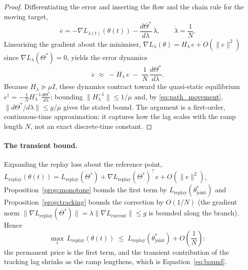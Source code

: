 \begin{proof}
    Differentiating the error and inserting the flow and the chain rule for the moving target,
    \begin{equation*}
        \dot e = -\nabla L_{\lambda(t)}(\theta(t)) - \frac{d\Theta^*}{d\lambda}\,\dot\lambda,
        \qquad \dot\lambda = \frac{1}{N}.
    \end{equation*}
    Linearising the gradient about the minimiser, $\nabla L_\lambda(\theta) = H_\lambda\, e + O(\|e\|^2)$ since $\nabla L_\lambda(\Theta^*) = 0$, yields the error dynamics
    \begin{equation*}
        \dot e \;\approx\; -H_\lambda\, e \;-\; \frac{1}{N}\, \frac{d\Theta^*}{d\lambda}.
    \end{equation*}
    Because $H_\lambda \succeq \mu I$, these dynamics contract toward the quasi-static equilibrium $e^\dagger = -\tfrac{1}{N} H_\lambda^{-1} \tfrac{d\Theta^*}{d\lambda}$; bounding $\|H_\lambda^{-1}\| \le 1/\mu$ and, by \eqref{eq:path_movement}, $\|d\Theta^*/d\lambda\| \le g/\mu$ gives the stated bound. The argument is a first-order, continuous-time approximation: it captures how the lag scales with the ramp length $N$, not an exact discrete-time constant.
\end{proof}

\paragraph{The transient bound.} Expanding the replay loss about the reference point, $L_{\text{replay}}(\theta(t)) = L_{\text{replay}}(\Theta^*) + \nabla L_{\text{replay}}(\Theta^*)^\top e + O(\|e\|^2)$, Proposition~\ref{prop:monotone} bounds the first term by $L_{\text{replay}}(\theta_{\text{joint}}^*)$ and Proposition~\ref{prop:tracking} bounds the correction by $O(1/N)$ (the gradient norm $\|\nabla L_{\text{replay}}(\Theta^*)\| = \lambda \|\nabla L_{\text{current}}\| \le g$ is bounded along the branch). Hence
\begin{equation}
    \max_t\, L_{\text{replay}}(\theta(t)) \;\le\; L_{\text{replay}}(\theta_{\text{joint}}^*) + O\!\left(\frac{1}{N}\right):
\end{equation}
the permanent price is the first term, and the transient contribution of the tracking lag shrinks as the ramp lengthens, which is Equation~\eqref{eq:bound}.
